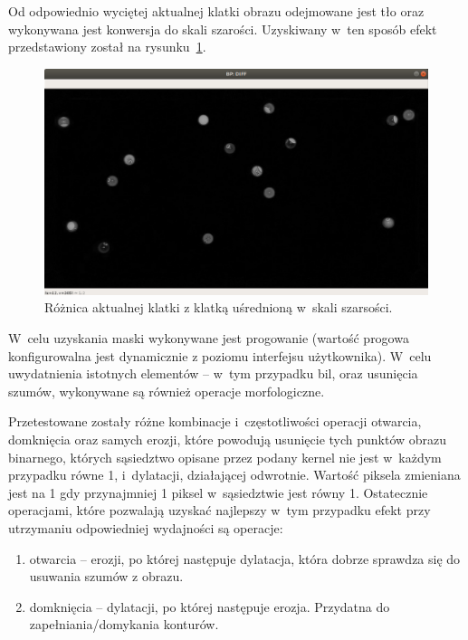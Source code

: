 \documentclass[12pt]{article}
\begin{document}
    Od odpowiednio wyciętej aktualnej klatki obrazu odejmowane jest tło  oraz wykonywana jest konwersja do skali szarości. Uzyskiwany w~ten sposób efekt przedstawiony został na rysunku~\ref{bp_diff}.

    \begin{figure}[h]
        \centering
        \includegraphics[width=15cm]{./images/obrazki/bp/bp_diff.png}
        \caption{Różnica aktualnej klatki z klatką uśrednioną w~skali szarsości.}
        \label{bp_diff}
    \end{figure}


    W~celu uzyskania maski wykonywane jest progowanie (wartość progowa konfigurowalna jest dynamicznie z poziomu interfejsu użytkownika). W~celu uwydatnienia istotnych elementów – w~tym przypadku bil, oraz usunięcia szumów, wykonywane są również operacje morfologiczne.
    \vspace{0.5cm}
    
    Przetestowane zostały różne kombinacje i~częstotliwości operacji otwarcia, domknięcia oraz samych erozji, które powodują usunięcie tych punktów obrazu binarnego, których sąsiedztwo opisane przez podany kernel nie jest w~każdym przypadku równe 1, i~dylatacji, działającej odwrotnie. Wartość piksela zmieniana jest na 1 gdy przynajmniej 1 piksel w~sąsiedztwie jest równy 1. Ostatecznie operacjami, które pozwalają uzyskać najlepszy w~tym przypadku efekt przy utrzymaniu odpowiedniej wydajności są operacje:

    \begin{enumerate}
        \item otwarcia – erozji, po której następuje dylatacja, która dobrze sprawdza się do usuwania szumów z obrazu.
        \item domknięcia – dylatacji, po której następuje erozja. Przydatna do zapełniania/domykania konturów.
    \end{enumerate}
\end{document}
